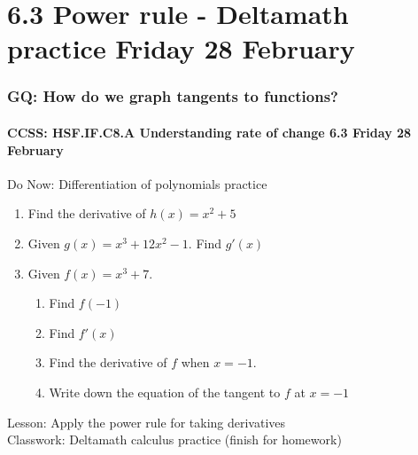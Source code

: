 \documentclass{beamer}
\begin{document}
  \section{6.3 Power rule - Deltamath practice \hfill Friday 28 February}
  \frame
  {
    \frametitle{GQ: How do we graph tangents to functions?}
    \framesubtitle{CCSS: HSF.IF.C8.A Understanding rate of change \hfill \alert{6.3  Friday 28 February}}

    \begin{block}{Do Now: Differentiation of polynomials practice}
      \begin{enumerate}
        \item Find the derivative of $h(x)=x^2+5$
        \item Given $g(x)=x^3 + 12x^2-1$. Find $g'(x)$
        \item Given $f(x)=x^3 + 7$. 
        \begin{enumerate}
          \item Find $f(-1)$
          \item Find $f'(x)$
          \item Find the derivative of $f$ when $x=-1$.
          \item Write down the equation of the tangent to $f$ at $x=-1$
        \end{enumerate}
        
      \end{enumerate}
      \end{block}
      Lesson: Apply the power rule for taking derivatives\\
      Classwork: Deltamath calculus practice (finish for homework)
      }
\end{document}
